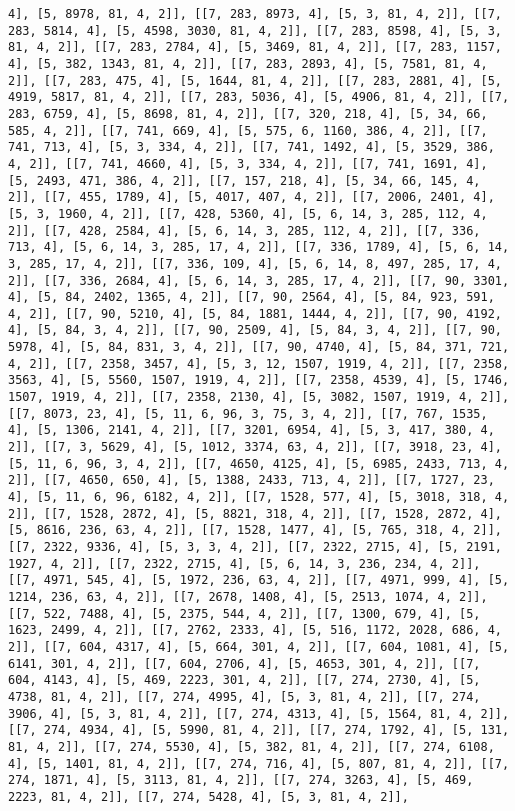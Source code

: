 \documentclass[12pt,fleqn]{article}\usepackage{../../common}
\begin{document}
\begin{verbatim}
4], [5, 8978, 81, 4, 2]], [[7, 283, 8973, 4], [5, 3, 81, 4, 2]], [[7, 283, 5814, 4], [5, 4598, 3030, 81, 4, 2]], [[7, 283, 8598, 4], [5, 3, 81, 4, 2]], [[7, 283, 2784, 4], [5, 3469, 81, 4, 2]], [[7, 283, 1157, 4], [5, 382, 1343, 81, 4, 2]], [[7, 283, 2893, 4], [5, 7581, 81, 4, 2]], [[7, 283, 475, 4], [5, 1644, 81, 4, 2]], [[7, 283, 2881, 4], [5, 4919, 5817, 81, 4, 2]], [[7, 283, 5036, 4], [5, 4906, 81, 4, 2]], [[7, 283, 6759, 4], [5, 8698, 81, 4, 2]], [[7, 320, 218, 4], [5, 34, 66, 585, 4, 2]], [[7, 741, 669, 4], [5, 575, 6, 1160, 386, 4, 2]], [[7, 741, 713, 4], [5, 3, 334, 4, 2]], [[7, 741, 1492, 4], [5, 3529, 386, 4, 2]], [[7, 741, 4660, 4], [5, 3, 334, 4, 2]], [[7, 741, 1691, 4], [5, 2493, 471, 386, 4, 2]], [[7, 157, 218, 4], [5, 34, 66, 145, 4, 2]], [[7, 455, 1789, 4], [5, 4017, 407, 4, 2]], [[7, 2006, 2401, 4], [5, 3, 1960, 4, 2]], [[7, 428, 5360, 4], [5, 6, 14, 3, 285, 112, 4, 2]], [[7, 428, 2584, 4], [5, 6, 14, 3, 285, 112, 4, 2]], [[7, 336, 713, 4], [5, 6, 14, 3, 285, 17, 4, 2]], [[7, 336, 1789, 4], [5, 6, 14, 3, 285, 17, 4, 2]], [[7, 336, 109, 4], [5, 6, 14, 8, 497, 285, 17, 4, 2]], [[7, 336, 2684, 4], [5, 6, 14, 3, 285, 17, 4, 2]], [[7, 90, 3301, 4], [5, 84, 2402, 1365, 4, 2]], [[7, 90, 2564, 4], [5, 84, 923, 591, 4, 2]], [[7, 90, 5210, 4], [5, 84, 1881, 1444, 4, 2]], [[7, 90, 4192, 4], [5, 84, 3, 4, 2]], [[7, 90, 2509, 4], [5, 84, 3, 4, 2]], [[7, 90, 5978, 4], [5, 84, 831, 3, 4, 2]], [[7, 90, 4740, 4], [5, 84, 371, 721, 4, 2]], [[7, 2358, 3457, 4], [5, 3, 12, 1507, 1919, 4, 2]], [[7, 2358, 3563, 4], [5, 5560, 1507, 1919, 4, 2]], [[7, 2358, 4539, 4], [5, 1746, 1507, 1919, 4, 2]], [[7, 2358, 2130, 4], [5, 3082, 1507, 1919, 4, 2]], [[7, 8073, 23, 4], [5, 11, 6, 96, 3, 75, 3, 4, 2]], [[7, 767, 1535, 4], [5, 1306, 2141, 4, 2]], [[7, 3201, 6954, 4], [5, 3, 417, 380, 4, 2]], [[7, 3, 5629, 4], [5, 1012, 3374, 63, 4, 2]], [[7, 3918, 23, 4], [5, 11, 6, 96, 3, 4, 2]], [[7, 4650, 4125, 4], [5, 6985, 2433, 713, 4, 2]], [[7, 4650, 650, 4], [5, 1388, 2433, 713, 4, 2]], [[7, 1727, 23, 4], [5, 11, 6, 96, 6182, 4, 2]], [[7, 1528, 577, 4], [5, 3018, 318, 4, 2]], [[7, 1528, 2872, 4], [5, 8821, 318, 4, 2]], [[7, 1528, 2872, 4], [5, 8616, 236, 63, 4, 2]], [[7, 1528, 1477, 4], [5, 765, 318, 4, 2]], [[7, 2322, 9336, 4], [5, 3, 3, 4, 2]], [[7, 2322, 2715, 4], [5, 2191, 1927, 4, 2]], [[7, 2322, 2715, 4], [5, 6, 14, 3, 236, 234, 4, 2]], [[7, 4971, 545, 4], [5, 1972, 236, 63, 4, 2]], [[7, 4971, 999, 4], [5, 1214, 236, 63, 4, 2]], [[7, 2678, 1408, 4], [5, 2513, 1074, 4, 2]], [[7, 522, 7488, 4], [5, 2375, 544, 4, 2]], [[7, 1300, 679, 4], [5, 1623, 2499, 4, 2]], [[7, 2762, 2333, 4], [5, 516, 1172, 2028, 686, 4, 2]], [[7, 604, 4317, 4], [5, 664, 301, 4, 2]], [[7, 604, 1081, 4], [5, 6141, 301, 4, 2]], [[7, 604, 2706, 4], [5, 4653, 301, 4, 2]], [[7, 604, 4143, 4], [5, 469, 2223, 301, 4, 2]], [[7, 274, 2730, 4], [5, 4738, 81, 4, 2]], [[7, 274, 4995, 4], [5, 3, 81, 4, 2]], [[7, 274, 3906, 4], [5, 3, 81, 4, 2]], [[7, 274, 4313, 4], [5, 1564, 81, 4, 2]], [[7, 274, 4934, 4], [5, 5990, 81, 4, 2]], [[7, 274, 1792, 4], [5, 131, 81, 4, 2]], [[7, 274, 5530, 4], [5, 382, 81, 4, 2]], [[7, 274, 6108, 4], [5, 1401, 81, 4, 2]], [[7, 274, 716, 4], [5, 807, 81, 4, 2]], [[7, 274, 1871, 4], [5, 3113, 81, 4, 2]], [[7, 274, 3263, 4], [5, 469, 2223, 81, 4, 2]], [[7, 274, 5428, 4], [5, 3, 81, 4, 2]], 
\end{verbatim}
\end{document}
